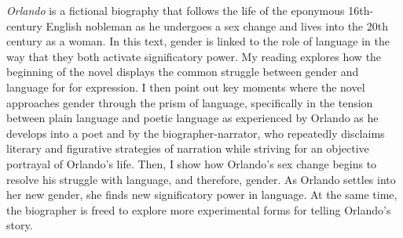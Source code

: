 \documentclass[11pt]{article}
\begin{document}
\emph{Orlando} is a fictional biography that follows the life of the
eponymous 16th-century English nobleman as he undergoes a sex change
and lives into the 20th century as a woman. In this text, gender is
linked to the role of language in the way that they both activate
significatory power. My reading explores how the beginning of the
novel displays the common struggle between gender and language for for
expression. I then point out key moments where the novel approaches
gender through the prism of language, specifically in the tension
between plain language and poetic language as experienced by Orlando
as he develops into a poet and by the biographer-narrator, who
repeatedly disclaims literary and figurative strategies of narration
while striving for an objective portrayal of Orlando's life. Then, I
show how Orlando's sex change begins to resolve his struggle with
language, and therefore, gender. As Orlando settles into her new
gender, she finds new significatory power in language. At the same
time, the biographer is freed to explore more experimental forms for
telling Orlando's story.
\end{document}
